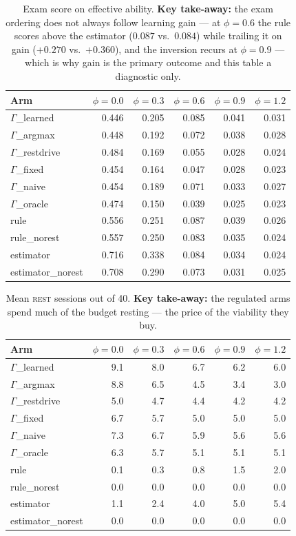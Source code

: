 \documentclass{article}
\begin{document}
\begin{table}[H]
  \caption{Exam score on effective ability. \textbf{Key take-away:} the exam ordering does not always follow learning gain --- at $\phi{=}0.6$ the rule scores above the estimator ($0.087$ vs.\ $0.084$) while trailing it on gain ($+0.270$ vs.\ $+0.360$), and the inversion recurs at $\phi{=}0.9$ --- which is why gain is the primary outcome and this table a diagnostic only.}
  \label{app:exam}
  \centering
  \small
  \begin{tabular}{lrrrrr}
    \toprule
    Arm & $\phi{=}0.0$ & $\phi{=}0.3$ & $\phi{=}0.6$ & $\phi{=}0.9$ & $\phi{=}1.2$ \\
    \midrule
    $\Gamma$\_learned & 0.446 & 0.205 & 0.085 & 0.041 & 0.031 \\
    $\Gamma$\_argmax & 0.448 & 0.192 & 0.072 & 0.038 & 0.028 \\
    $\Gamma$\_restdrive & 0.484 & 0.169 & 0.055 & 0.028 & 0.024 \\
    $\Gamma$\_fixed & 0.454 & 0.164 & 0.047 & 0.028 & 0.023 \\
    $\Gamma$\_naive & 0.454 & 0.189 & 0.071 & 0.033 & 0.027 \\
    $\Gamma$\_oracle & 0.474 & 0.150 & 0.039 & 0.025 & 0.023 \\
    rule & 0.556 & 0.251 & 0.087 & 0.039 & 0.026 \\
    rule\_norest & 0.557 & 0.250 & 0.083 & 0.035 & 0.024 \\
    estimator & 0.716 & 0.338 & 0.084 & 0.034 & 0.024 \\
    estimator\_norest & 0.708 & 0.290 & 0.073 & 0.031 & 0.025 \\
    \bottomrule
  \end{tabular}
\end{table}
\begin{table}[H]
  \caption{Mean \textsc{rest} sessions out of 40. \textbf{Key take-away:} the regulated arms spend much of the budget resting --- the price of the viability they buy.}
  \label{app:rest}
  \centering
  \small
  \begin{tabular}{lrrrrr}
    \toprule
    Arm & $\phi{=}0.0$ & $\phi{=}0.3$ & $\phi{=}0.6$ & $\phi{=}0.9$ & $\phi{=}1.2$ \\
    \midrule
    $\Gamma$\_learned & 9.1 & 8.0 & 6.7 & 6.2 & 6.0 \\
    $\Gamma$\_argmax & 8.8 & 6.5 & 4.5 & 3.4 & 3.0 \\
    $\Gamma$\_restdrive & 5.0 & 4.7 & 4.4 & 4.2 & 4.2 \\
    $\Gamma$\_fixed & 6.7 & 5.7 & 5.0 & 5.0 & 5.0 \\
    $\Gamma$\_naive & 7.3 & 6.7 & 5.9 & 5.6 & 5.6 \\
    $\Gamma$\_oracle & 6.3 & 5.7 & 5.1 & 5.1 & 5.1 \\
    rule & 0.1 & 0.3 & 0.8 & 1.5 & 2.0 \\
    rule\_norest & 0.0 & 0.0 & 0.0 & 0.0 & 0.0 \\
    estimator & 1.1 & 2.4 & 4.0 & 5.0 & 5.4 \\
    estimator\_norest & 0.0 & 0.0 & 0.0 & 0.0 & 0.0 \\
    \bottomrule
  \end{tabular}
\end{table}
\end{document}
